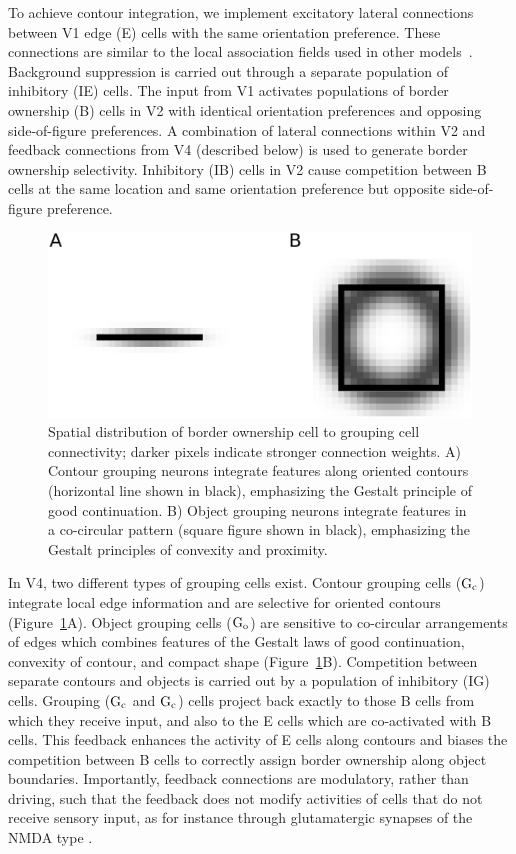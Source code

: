 To achieve contour integration, we implement excitatory lateral
connections between V1 edge (E) cells with the same orientation
preference. These connections are similar to the local association
fields used in other models~\citep{Li98,Piech_etal13}. Background
suppression is carried out through a separate population of inhibitory
(IE) cells. The input from V1 activates populations of border
ownership (B) cells in V2 with identical orientation preferences and
opposing side-of-figure preferences. A combination of lateral
connections within V2 and feedback connections from V4 (described
below) is used to generate border ownership selectivity. Inhibitory
(IB) cells in V2 cause competition between B cells at the same
location and same orientation preference but opposite side-of-figure
preference.

\begin{figure}[t]
\centering
\includegraphics[width=\textwidth]{Contour/figs/Fig2.eps}
\makeatletter
\let\@currsize\normalsize
\caption[Contour and object grouping cell receptive fields]{Spatial distribution of border ownership cell to grouping cell connectivity; darker pixels indicate stronger connection weights. A) Contour grouping neurons integrate features along oriented contours (horizontal line shown in black), emphasizing the Gestalt principle of good continuation. B) Object grouping neurons integrate features in a co-circular pattern (square figure shown in black), emphasizing the Gestalt principles of convexity and proximity.} 
\label{Fig:BG_projections}
\end{figure}

In V4, two different types of grouping cells exist. Contour grouping cells ($\rm G_c$) integrate local edge information and are selective for oriented contours (Figure~\ref{Fig:BG_projections}A). Object grouping cells ($\rm G_o$) are sensitive to  co-circular arrangements of edges which combines
features of the Gestalt laws of good continuation, convexity of contour, and compact shape
(Figure~\ref{Fig:BG_projections}B). Competition between separate contours and objects is carried out by a population of inhibitory (IG) cells. Grouping ($\rm G_c$ and $\rm G_c$) cells project back exactly to those B cells from which they receive input, and also to the E cells which are co-activated with B cells. This feedback enhances the activity of E cells along contours and biases the competition between B cells to correctly assign border ownership along object boundaries. Importantly, feedback connections are modulatory, rather than driving, such that the feedback does not modify activities of cells that do not receive sensory input, as for instance through glutamatergic synapses of the NMDA type \citep{Wagatsuma_etal16a}.

